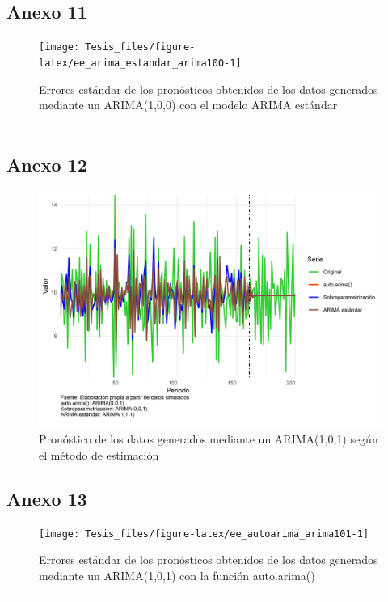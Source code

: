 \documentclass[
]{article}
\begin{document}
\subsection{Anexo 11}

\begin{figure}[H]
\texttt{[image: Tesis\_files/figure-latex/ee\_arima\_estandar\_arima100-1]} \caption{Errores estándar de los pronósticos obtenidos de los datos generados mediante un ARIMA(1,0,0) con el modelo ARIMA estándar \textcolor{white}{prueba de aaaaaaaaaaaaaaaaaaaaaaa}}\label{fig:ee_arima_estandar_arima100}
\end{figure}

\subsection{Anexo 12}

\begin{figure}[H]
\includegraphics[width=1\linewidth,height=1\textheight]{Tesis_files/figure-latex/pronostico_arima101-1} \caption{Pronóstico de los datos generados mediante un ARIMA(1,0,1) según el método de estimación \textcolor{white}{prueba de aaaaaaaaaaaaaaaaaaaaaaa}}\label{fig:pronostico_arima101}
\end{figure}

\subsection{Anexo 13}

\begin{figure}[H]
\texttt{[image: Tesis\_files/figure-latex/ee\_autoarima\_arima101-1]} \caption{Errores estándar de los pronósticos obtenidos de los datos generados mediante un ARIMA(1,0,1) con la función auto.arima() \textcolor{white}{prueba de aaaaaaaaaaaaaaaaaaaaaaa}}\label{fig:ee_autoarima_arima101}
\end{figure}
\end{document}
